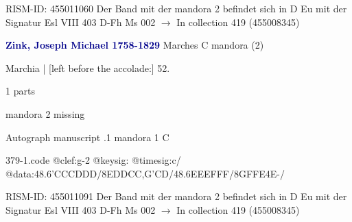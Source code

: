 \documentclass[twocolumn]{book}
\begin{document}
\newline RISM-ID: 455011060
\newline Der Band mit der mandora 2 befindet sich in D Eu mit der Signatur Esl VIII 403
\newline D-Fh  Ms 002
\newline $\rightarrow$ In collection 419 (455008345)

\newline \par \vspace{7pt} \textcolor{darkblue}{\textbf{Zink, Joseph Michael  1758-1829}}
\newline Marches  C  
\newline mandora (2)
\newline \begin{itshape}[f.27v, at left:] Marchia | [left before the accolade:] 52.\end{itshape} 
\newline \textcolor{darkblue}{}  1 parts  
\newline \begin{small} mandora 2 missing\end{small} 
\newline Autograph manuscript
.1  mandora 1  C  
\begin{filecontents*}{379-1.code}
@clef:g-2
@keysig:
@timesig:c/
@data:48.6'C{CC}D{DD}/{8EDDC}{C,G'CD}/48.6E{EE}F{FF}/{8GFFE}4E-/
\end{filecontents*}
\newline
%

\newline RISM-ID: 455011091
\newline Der Band mit der mandora 2 befindet sich in D Eu mit der Signatur Esl VIII 403
\newline D-Fh  Ms 002
\newline $\rightarrow$ In collection 419 (455008345)
\end{document}
